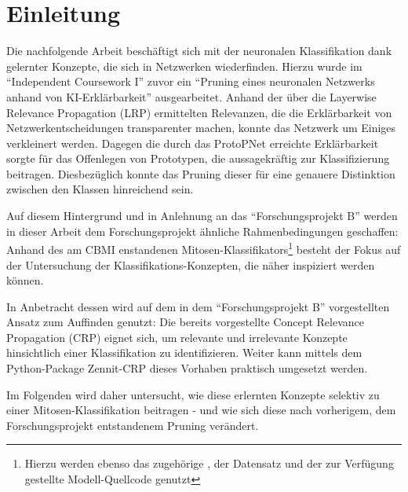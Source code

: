 \section{Einleitung}
Die nachfolgende Arbeit beschäftigt sich mit der neuronalen Klassifikation dank gelernter Konzepte, die sich in Netzwerken wiederfinden.
Hierzu wurde im  ``Independent Coursework I'' zuvor ein ``Pruning eines neuronalen Netzwerks anhand von KI-Erklärbarkeit'' ausgearbeitet. 
Anhand der über die Layerwise Relevance Propagation (LRP) \cite{DBLP:journals/corr/abs-1912-08881} ermittelten Relevanzen, die die Erklärbarkeit von Netzwerkentscheidungen transparenter machen, konnte das Netzwerk um Einiges verkleinert werden. 
Dagegen die durch das ProtoPNet \cite{Mohammadjafari2021Using} erreichte Erklärbarkeit sorgte für das Offenlegen von Prototypen, die aussagekräftig zur Klassifizierung beitragen. Diesbezüglich konnte das Pruning dieser für eine genauere Distinktion zwischen den Klassen hinreichend sein. 

Auf diesem Hintergrund und in Anlehnung an das ``Forschungsprojekt B'' werden in dieser Arbeit dem Forschungsprojekt ähnliche Rahmenbedingungen geschaffen: Anhand des am CBMI \cite{cbmi} enstandenen Mitosen-Klassifikators\footnote[1]{Hierzu werden ebenso das zugehörige , der Datensatz  und der zur Verfügung gestellte Modell-Quellcode genutzt} besteht der Fokus auf der Untersuchung der Klassifikations-Konzepten, die näher inspiziert werden können.


In Anbetracht dessen wird auf dem in dem ``Forschungsprojekt B'' vorgestellten Ansatz zum Auffinden genutzt: Die bereits vorgestellte Concept Relevance Propagation (CRP) \cite{achtibat2022towards} eignet sich, um relevante und irrelevante Konzepte hinsichtlich einer Klassifikation zu identifizieren. Weiter kann mittels dem Python-Package Zennit-CRP \cite{achtibat2022crpzennit} dieses Vorhaben praktisch umgesetzt werden.

Im Folgenden wird daher untersucht, wie diese erlernten Konzepte selektiv zu einer Mitosen-Klassifikation beitragen - und wie sich diese nach vorherigem, dem Forschungsprojekt entstandenem Pruning verändert.
